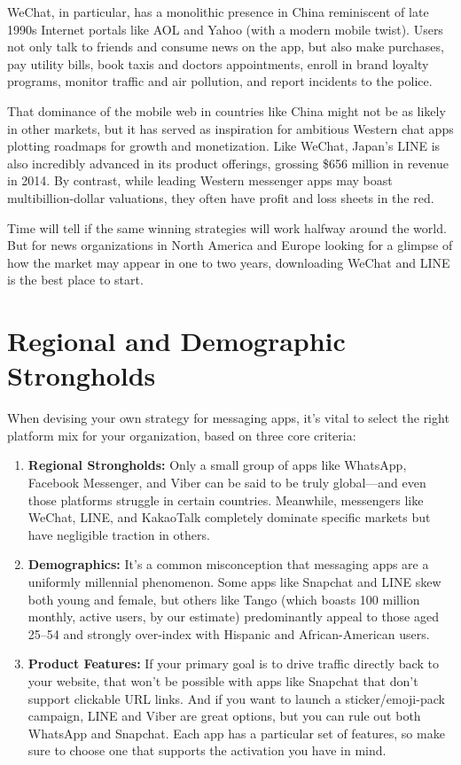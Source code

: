 \documentclass[notoc, symmetric, nobib, nols]{towcenter-guideto-book}
\begin{document}
WeChat, in particular, has a monolithic presence in China reminiscent of late 1990s Internet portals like AOL and Yahoo (with a modern mobile twist). Users not only talk to friends and consume news on the app, but also make purchases, pay utility bills, book taxis and doctors appointments, enroll in brand loyalty programs, monitor traffic and air pollution, and report incidents to the police.  

That dominance of the mobile web in countries like China might not be as likely in other markets, but it has served as inspiration for ambitious Western chat apps plotting roadmaps for growth and monetization. Like WeChat, Japan's LINE is also incredibly advanced in its product offerings, grossing \$656 million in revenue in 2014. By contrast, while leading Western messenger apps may boast multibillion-dollar valuations, they often have profit and loss sheets in the red.

Time will tell if the same winning strategies will work halfway around the world. But for news organizations in North America and Europe looking for a glimpse of how the market may appear in one to two years, downloading WeChat and LINE is the best place to start. 

\section[Regional and Demographic Strongholds]{Regional and Demographic Strongholds}

When devising your own strategy for messaging apps, it's vital to select the right platform mix for your organization, based on three core criteria:

\begin{enumerate}[itemsep=1em]
\item\textbf{Regional Strongholds:} Only a small group of apps like WhatsApp, Facebook Messenger, and Viber can be said to be truly global---and even those platforms struggle in certain countries. Meanwhile, messengers like WeChat, LINE, and KakaoTalk completely dominate specific markets but have negligible traction in others.

\item\textbf{Demographics:} It's a common misconception that messaging apps are a uniformly millennial phenomenon. Some apps like Snapchat and LINE skew both young and female, but others like Tango (which boasts 100 million monthly, active users, by our estimate) predominantly appeal to those aged 25--54 and strongly over-index with Hispanic and African-American users.  

\item\textbf{Product Features:} If your primary goal is to drive traffic directly back to your website, that won't be possible with apps like Snapchat that don't support clickable URL links. And if you want to launch a sticker/emoji-pack campaign, LINE and Viber are great options, but you can rule out both WhatsApp and Snapchat. Each app has a particular set of features, so make sure to choose one that supports the activation you have in mind.\end{enumerate}
\end{document}
